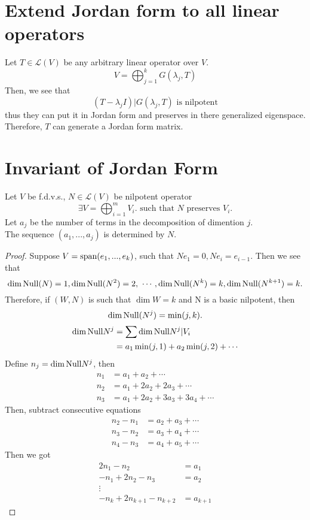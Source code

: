 \documentclass{aq-notes}
\newcommand{\Null}{\mbox{\normalfont Null}}
\newcommand{\Span}{\mbox{\normalfont span}}
\begin{document}
\section{Extend Jordan form to all linear operators}
    Let $T\in \mathcal{L}(V)$ be any arbitrary linear operator over $V$.
    \[V = \bigoplus_{j=1}^kG(\lambda_j,T)\]
    Then, we see that 
    \[(T-\lambda_jI)\vert {G(\lambda_j,T)} \mbox{ is nilpotent}\]
    thus they can put it in Jordan form and preserves in there generalized eigenspace.\\
    Therefore, $T$ can generate a Jordan form matrix.

\section{Invariant of Jordan Form}
\begin{theorem}
    Let $V$ be f.d.v.s., $N\in \mathcal{L}(V)$ be nilpotent operator
    \[\exists V = \bigoplus_{i=1}^mV_i. \mbox{ such that $N$ preserves $V_i$.}\]
    Let $a_j$ be the number of terms in the decomposition of dimention $j$.\\
    The sequence $(a_1,...,a_j)$ is determined by $N$.
\begin{proof}

Suppose $V = \Span(e_1,...,e_k)$, such that $Ne_1=0, Ne_i = e_{i-1}$. Then we see that
\[\dim \Null(N) = 1, \dim \Null(N^2) = 2,\ \cdots,\dim \Null(N^k) = k, \dim \Null(N^{k+1}) = k.\]
Therefore, if $(W,N)$ is such that $\dim W = k$ and N is a basic nilpotent, then \[\dim \Null(N^j) = \min(j,k).\]
\begin{align*}
    \dim \Null N^j &= \sum\dim \Null N^j\vert {V_i}\\
&=a_1\min(j,1)+a_2\min(j,2)+\cdots
\end{align*}
Define $n_j  = \dim\Null N^j$, then
\begin{align*}
    n_1 &= a_1+a_2+\cdots\\
    n_2 &= a_1+2a_2+2a_3+\cdots\\
    n_3 &= a_1+2a_2+3a_3+3a_4+\cdots
\end{align*}
Then, subtract consecutive equations
\begin{align*}
    n_2-n_1 &= a_2+a_3+\cdots\\
    n_3-n_2 &= a_3+a_4+\cdots\\
    n_4-n_3 &= a_4 + a_5+ \cdots
\end{align*}
Then we got
\begin{align*}
    	2n_1-n_2&= a_1\\
    	-n_1+2n_2-n_3 &= a_2\\
    	\vdots\\
    	-n_k+2n_{k+1}-n_{k+2} &= a_{k+1}
\end{align*}
\end{proof}
\end{theorem}
\end{document}
